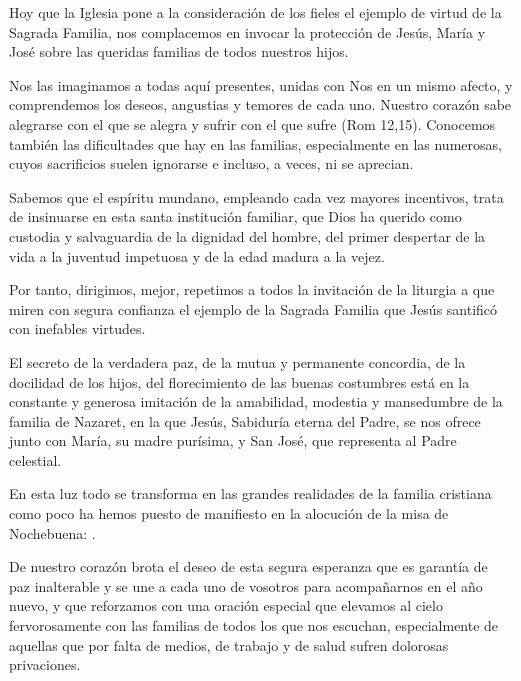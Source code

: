 				\begin{body}
					Hoy que la Iglesia pone a la consideración de los fieles el ejemplo de virtud de la Sagrada Familia, nos complacemos en invocar la protección de Jesús, María y José sobre las queridas familias de todos nuestros hijos.
					
					Nos las imaginamos a todas aquí presentes, unidas con Nos en un mismo afecto, y comprendemos los deseos, angustias y temores de cada uno. Nuestro corazón sabe alegrarse con el que se alegra y sufrir con el que sufre (Rom 12,15). Conocemos también las dificultades que hay en las familias, especialmente en las numerosas, cuyos sacrificios suelen ignorarse e incluso, a veces, ni se aprecian.
					
					Sabemos que el espíritu mundano, empleando cada vez mayores incentivos, trata de insinuarse en esta santa institución familiar, que Dios ha querido como custodia y salvaguardia de la dignidad del hombre, del primer despertar de la vida a la juventud impetuosa y de la edad madura a la vejez.
					
					Por tanto, dirigimos, mejor, repetimos a todos la invitación de la liturgia a que miren con segura confianza el ejemplo de la Sagrada Familia que Jesús santificó con inefables virtudes.
					
					El secreto de la verdadera paz, de la mutua y permanente concordia, de la docilidad de los hijos, del florecimiento de las buenas costumbres está en la constante y generosa imitación de la amabilidad, modestia y mansedumbre de la familia de Nazaret, en la que Jesús, Sabiduría eterna del Padre, se nos ofrece junto con María, su madre purísima, y San José, que representa al Padre celestial.
					
					En esta luz todo se transforma en las grandes realidades de la familia cristiana como poco ha hemos puesto de manifiesto en la alocución de la misa de Nochebuena: .
					
					De nuestro corazón brota el deseo de esta segura esperanza que es garantía de paz inalterable y se une a cada uno de vosotros para acompañarnos en el año nuevo, y que reforzamos con una oración especial que elevamos al cielo fervorosamente con las familias de todos los que nos escuchan, especialmente de aquellas que por falta de medios, de trabajo y de salud sufren dolorosas privaciones.
					

\end{body}
